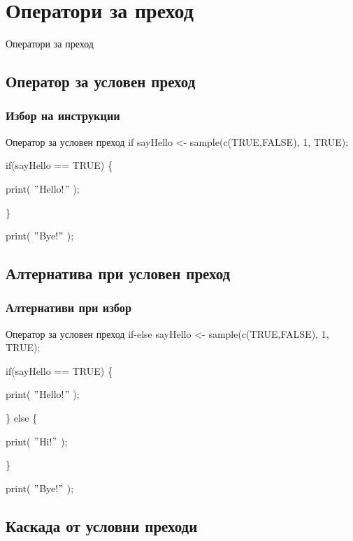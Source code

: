 \documentclass{beamer}
\begin{document}
\section{Оператори за преход}

\begin{frame}
\center \huge{Оператори за преход}
\end{frame}

\subsection{Оператор за условен преход}

\begin{frame}
\frametitle{Избор на инструкции}
\begin{block}{Оператор за условен преход if}
sayHello <- sample(c(TRUE,FALSE), 1, TRUE);

if(sayHello == TRUE) \{

	print( $"$Hello!$"$ );
	
\}

print( $"$Bye!$"$ );
\end{block}
\end{frame}

\subsection{Алтернатива при условен преход}

\begin{frame}
\frametitle{Алтернативи при избор}
\begin{block}{Оператор за условен преход if-else}
sayHello <- sample(c(TRUE,FALSE), 1, TRUE);

if(sayHello == TRUE) \{

	print( $"$Hello!$"$ );

\} else \{

	print( $"$Hi!$"$ );

\}

print( $"$Bye!$"$ );
\end{block}
\end{frame}

\subsection{Каскада от условни преходи}
\end{document}
